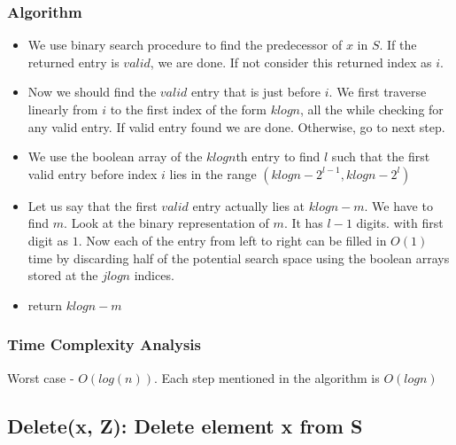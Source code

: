 \documentclass{article}
\begin{document}
\subsubsection{Algorithm}
\begin{itemize}
\item We use binary search procedure to find the predecessor of $x$ in $S$. If the returned entry is $valid$, we are done. If not consider this returned index as $i$. 
\item Now we should find the $valid$ entry that is just before $i$. We first traverse linearly from $i$ to the first index of the form $klogn$, all the while checking for any valid entry. If valid entry found we are done. Otherwise, go to next step.
\item We use the boolean array of the $klogn$th entry to find $l$ such that the first valid entry before index $i$ lies in the range $(klogn-2^{l-1}, klogn-2^l)$
\item Let  us say that the first $valid$ entry actually lies at $klogn - m$. We have to find $m$. Look at the binary representation of $m$. It has $l-1$ digits. with first digit as $1$. Now each of the entry from left to right can be filled in $O(1)$ time by discarding half of the potential search space using the boolean arrays stored at the $jlogn$ indices.
\item return $klogn - m$  
\end{itemize}
\subsubsection{Time Complexity Analysis}
Worst case - $O(log(n))$. Each step mentioned in the algorithm is $O(logn)$
\newpage
\subsection{Delete(x, Z): Delete element x from S}
\end{document}
